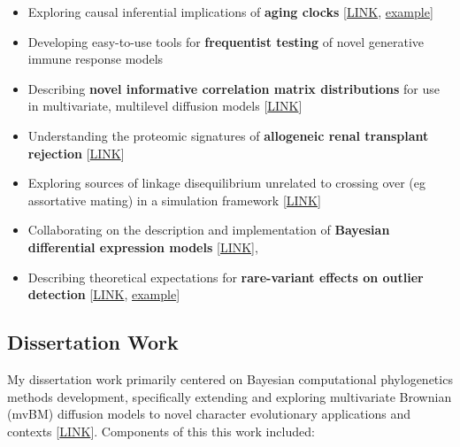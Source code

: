 \documentclass[12pt]{article}
\begin{document}
\begin{itemize}[noitemsep]
\item Exploring causal inferential implications of \textbf{aging clocks} [\href{https://github.com/NikVetr/montgomery\_lab/blob/61e2ac4b0fea0ee7f5bf31590a40378f0027264a/collider\_effects\_on\_R2.R#L4}{LINK}, \href{https://drive.google.com/file/d/1AQU0YMVoYCEFuIICHGIXGxoXm6dj7HxY/view}{example}]

\item Developing easy-to-use tools for \textbf{frequentist testing} of novel generative immune response models

\item Describing \textbf{novel informative correlation matrix distributions} for use in multivariate,  multilevel diffusion models [\href{https://github.com/NikVetr/dissertation\_work/blob/master/informative\_corrmat\_prior.R}{LINK}]

\item Understanding the proteomic signatures of \textbf{allogeneic renal transplant rejection} [\href{https://github.com/NikVetr/minor\_scripts/blob/c8926965b0c6dd9158351cf5836cbc76261f6830/postdoc/renal\_transplant\_censored\_poisson.R}{LINK}]

\item Exploring sources of linkage disequilibrium unrelated to crossing over (eg assortative mating) in a simulation framework [\href{https://github.com/NikVetr/montgomery\_lab/blob/61e2ac4b0fea0ee7f5bf31590a40378f0027264a/assortative\_mating.R}{LINK}]

\item Collaborating on the description and implementation of \textbf{Bayesian differential expression models} \href{https://github.com/bob-carpenter/BayesExpress/blob/main/latex/bayes-express/bayes-express.tex}{[LINK]},  

\item Describing theoretical expectations for \textbf{rare-variant effects on outlier detection} [\href{https://github.com/NikVetr/montgomery_lab/blob/61e2ac4b0fea0ee7f5bf31590a40378f0027264a/prop\_outliers\_zscores\_animation.R#L4}{LINK}, \href{https://drive.google.com/file/d/1mSp22\_cqarfMDFnS55Pjg7qqmkVnk1GI}{example}]

\end{itemize}

\subsection{Dissertation Work}

My dissertation work primarily centered on Bayesian computational phylogenetics methods development, specifically extending and exploring multivariate Brownian (mvBM) diffusion models to novel character evolutionary applications and contexts [\href{https://github.com/NikVetr/papers/blob/main/dissertation/dissertation_lashinsky_2020.pdf}{LINK}]. Components of this this work included:
\end{document}
